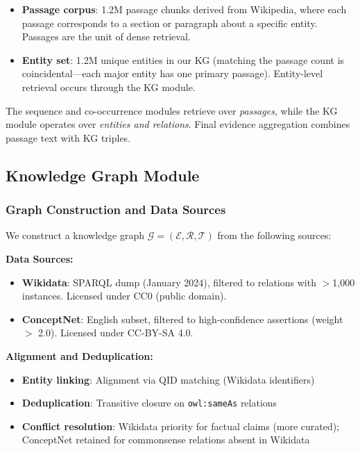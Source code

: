 \documentclass[10pt,twocolumn]{article}
\begin{document}
\begin{itemize}
    \item \textbf{Passage corpus}: 1.2M passage chunks derived from Wikipedia, where each passage corresponds to a section or paragraph about a specific entity. Passages are the unit of dense retrieval.
    \item \textbf{Entity set}: 1.2M unique entities in our KG (matching the passage count is coincidental---each major entity has one primary passage). Entity-level retrieval occurs through the KG module.
\end{itemize}

The sequence and co-occurrence modules retrieve over \textit{passages}, while the KG module operates over \textit{entities and relations}. Final evidence aggregation combines passage text with KG triples.


\subsection{Knowledge Graph Module}
\label{sec:ontology}

\subsubsection{Graph Construction and Data Sources}
\label{sec:kg_construction}

We construct a knowledge graph $\mathcal{G} = (\mathcal{E}, \mathcal{R}, \mathcal{T})$ from the following sources:

\textbf{Data Sources:}
\begin{itemize}
    \item \textbf{Wikidata}: SPARQL dump (January 2024), filtered to relations with $>$1,000 instances. Licensed under CC0 (public domain).
    \item \textbf{ConceptNet}: English subset, filtered to high-confidence assertions (weight $>$ 2.0). Licensed under CC-BY-SA 4.0.
\end{itemize}

\textbf{Alignment and Deduplication:}
\begin{itemize}
    \item \textbf{Entity linking}: Alignment via QID matching (Wikidata identifiers)
    \item \textbf{Deduplication}: Transitive closure on \texttt{owl:sameAs} relations
    \item \textbf{Conflict resolution}: Wikidata priority for factual claims (more curated); ConceptNet retained for commonsense relations absent in Wikidata
\end{itemize}
\end{document}
